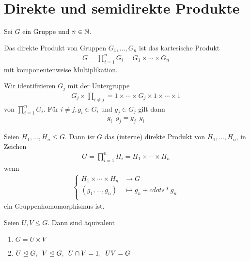 \section{Direkte und semidirekte Produkte}
%
Sei $G$ ein Gruppe und $n \in \mathbb{N}$.
%
\begin{defin}
	Das direkte Produkt von Gruppen $G_1, \dots , G_n$ ist das kartesische Produkt
	\begin{align*}
		G = \prod \limits_{i=1}^{n}{G_i} = G_1 \times \cdots \times G_n
	\end{align*}
	mit komponentenweise Multiplikation.
\end{defin}
%
\begin{bem}
	Wir identifizieren $G_j$ mit der Untergruppe
	\begin{align*}
		G_j \times \prod_{i \neq j} = 1 \times \cdots \times G_j \times 1 \times \cdots \times 1
	\end{align*}
	von $\prod_{i=1}^{n}{G_i}$. Für $i \neq j, g_i \in G_i$ und $g_j \in G_j$ gilt dann
	\begin{align} \label{eq: kommutierende_g}
		g_i \enspace g_j = g_j \enspace g_i
	\end{align}
\end{bem}
%
\begin{defin}
	Seien $H_1, \dots , H_n \leq G$. Dann isr $G$ das (interne) direkte Produkt von $H_1, \dots , H_n$, in Zeichen
	\begin{align*}
		G = \prod_{i=1}^{n}{H_i} = H_1 \times \cdots \times H_n
	\end{align*}
	wenn
	\begin{align*}
		\begin{cases}
			H_1 \times \cdots \times H_n & \to G \\
			(g_1, \dots , g_n) &\mapsto g_n + cdots * g_n \\
		\end{cases}
	\end{align*}
	ein Gruppenhomomorphismus ist.
\end{defin}
%
\begin{satz}[!]
	Seien $U,V \leq G$. Dann sind äquivalent
	\begin{enumerate}[label=(\arabic*)]
		\item $G = U \times V$
		\item $U \trianglelefteq G , \enspace V \trianglelefteq G , \enspace U \cap V = 1 , \enspace UV = G$
	\end{enumerate}
\end{satz}
